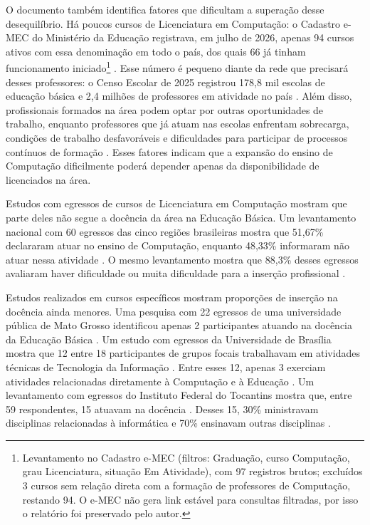 O documento também identifica fatores que dificultam a superação desse desequilíbrio. Há poucos cursos de Licenciatura em Computação: o Cadastro e-MEC do Ministério da Educação registrava, em julho de 2026, apenas 94 cursos ativos com essa denominação em todo o país, dos quais 66 já tinham funcionamento iniciado\footnote{Levantamento no Cadastro e-MEC (filtros: Graduação, curso Computação, grau Licenciatura, situação Em Atividade), com 97 registros brutos; excluídos 3 cursos sem relação direta com a formação de professores de Computação, restando 94. O e-MEC não gera link estável para consultas filtradas, por isso o relatório foi preservado pelo autor.} \cite{brasil2026emec}. Esse número é pequeno diante da rede que precisará desses professores: o Censo Escolar de 2025 registrou 178,8 mil escolas de educação básica e 2,4 milhões de professores em atividade no país \cite{inep2025apresentacaocenso2024}. Além disso, profissionais formados na área podem optar por outras oportunidades de trabalho, enquanto professores que já atuam nas escolas enfrentam sobrecarga, condições de trabalho desfavoráveis e dificuldades para participar de processos contínuos de formação \cite{sbc2025grandesdesafios}. Esses fatores indicam que a expansão do ensino de Computação dificilmente poderá depender apenas da disponibilidade de licenciados na área.

Estudos com egressos de cursos de Licenciatura em Computação mostram que parte deles não segue a docência da área na Educação Básica. Um levantamento nacional com 60 egressos das cinco regiões brasileiras mostra que 51,67\% declararam atuar no ensino de Computação, enquanto 48,33\% informaram não atuar nessa atividade \cite{teixeira2019perfil}. O mesmo levantamento mostra que 88,3\% desses egressos avaliaram haver dificuldade ou muita dificuldade para a inserção profissional \cite{teixeira2019perfil}.

Estudos realizados em cursos específicos mostram proporções de inserção na docência ainda menores. Uma pesquisa com 22 egressos de uma universidade pública de Mato Grosso identificou apenas 2 participantes atuando na docência da Educação Básica \cite{oliveira2018insercao}. Um estudo com egressos da Universidade de Brasília mostra que 12 entre 18 participantes de grupos focais trabalhavam em atividades técnicas de Tecnologia da Informação \cite{pinheiro2017egressos}. Entre esses 12, apenas 3 exerciam atividades relacionadas diretamente à Computação e à Educação \cite{pinheiro2017egressos}. Um levantamento com egressos do Instituto Federal do Tocantins mostra que, entre 59 respondentes, 15 atuavam na docência \cite{rodrigues2020perfil}. Desses 15, 30\% ministravam disciplinas relacionadas à informática e 70\% ensinavam outras disciplinas \cite{rodrigues2020perfil}.

